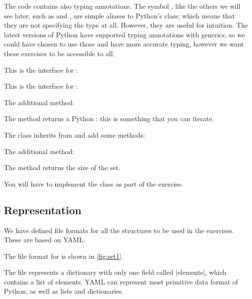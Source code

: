 The code contains also typing annotations.
The symbol , like the others we will see later, such as  and , are simple aliases to Python's  class; which means that they are not specifying the type at all.
However, they are useful for intuition.
The latest versions of Python have supported typing annotations with generics, so we could have chosen to use those and have more accurate typing, however we want these exercises to be accessible to all.


This is the interface for :


This is the interface for :


The additional method:
\begin{compactitem}
  \item The method  returns a Python : this is something that you can iterate.
\end{compactitem}



The class inherits from  and add some methods:

The additional method:
\begin{compactitem}
  \item The method  returns the size of the set.
\end{compactitem}

You will have to implement the  class as part of the exercise.


\subsection*{Representation}

We have defined file formats for all the structures to be used in the exercises.
These are based on YAML\@.


The file format for  is shown in \cref{fig:set1}.



The file represents a dictionary with only one field called \pystr|elements|, which contains a list of elements.
YAML can represent most primitive data format of Python, as well as lists and dictionaries.

